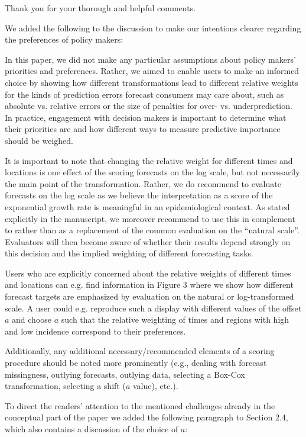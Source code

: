 \documentclass{article}
\newcommand{\black}{\color{black}}
\newcommand{\blue}{\color{blue}}
\newcommand{\indented}{\setlength{\leftskip}{1cm}}
\newcommand{\notindented}{\setlength{\leftskip}{0cm}}
\begin{document}
\black

Thank you for your thorough and helpful comments. 
 
We added the following to the discussion to make our intentions clearer regarding the preferences of policy makers: 

\indented
In this paper, we did not make any particular assumptions about policy makers' priorities and preferences. Rather, we aimed to enable users to make an informed choice by showing how different transformations lead to different relative weights for the kinds of prediction errors forecast consumers may care about, such as absolute vs. relative errors or the size of penalties for over- vs. underprediction. In practice, engagement with decision makers is important to determine what their priorities are and how different ways to measure predictive importance should be weighed.  

\notindented
It is important to note that changing the relative weight for different times and locations is one effect of the scoring forecasts on the log scale, but not necessarily the main point of the transformation. Rather, we do recommend to evaluate forecasts on the log scale as we believe the interpretation as a score of the exponential growth rate is meaningful in an epidemiological context. As stated explicitly in the manuscript, we moreover recommend to use this in complement to rather than as a replacement of the common evaluation on the ``natural scale''. Evaluators will then become aware of whether their results depend strongly on this decision and the implied weighting of different forecasting tasks.

Users who are explicitly concerned about the relative weights of different times and locations can e.g. find information in Figure 3 where we show how different forecast targets are emphasized by evaluation on the natural or log-transformed scale. A user could e.g. reproduce such a display with different values of the offset $a$ and choose $a$ such that the relative weighting of times and regions with high and low incidence correspond to their preferences. 

\blue
Additionally, any additional necessary/recommended elements of a scoring procedure should be noted more prominently (e.g., dealing with forecast missingness, outlying forecasts, outlying data, selecting a Box-Cox transformation, selecting a shift ($a$ value), etc.).

\black

To direct the readers' attention to the mentioned challenges already in the conceptual part of the paper we added the following paragraph to Section 2.4, which also contains a discussion of the choice of $a$:
\end{document}
